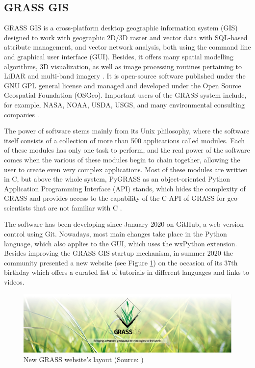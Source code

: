 \documentclass[a4paper,10pt,twoside]{article}
\begin{document}
\newpage
\vspace*{-1cm}
\subsection{GRASS GIS}
\label{subsection:grassgis}
\noindent GRASS GIS is a cross-platform desktop geographic information
system (GIS) designed to work with geographic 2D/3D raster and vector
data with SQL-based attribute management, and vector network analysis,
both using the command line and graphical user interface
(GUI). Besides, it offers many spatial modelling algorithms, 3D
visualization, as well as image processing routines pertaining to
LiDAR and multi-band imagery \cite{NETELER2012124}. It is open-source
software published under the GNU GPL general license and managed and
developed under the Open Source Geospatial Foundation
(OSGeo). Important users of the GRASS system include, for example,
NASA, NOAA, USDA, USGS, and many environmental consulting companies
\cite{grassgis}.

The power of software stems mainly from its Unix philosophy, where the
software itself consists of a collection of more than 500 applications
called modules. Each of these modules has only one task to perform,
and the real power of the software comes when the various of these
modules begin to chain together, allowing the user to create even very
complex applications. Most of these modules are written in C, but
above the whole system, PyGRASS as an object-oriented Python
Application Programming Interface (API) stands, which hides the
complexity of GRASS and provides access to the capability of the C-API
of GRASS for geo-scientists that are not familiar with C
\cite{pygrass}.

The software has been developing since January 2020 on GitHub, a web
version control using Git. Nowadays, most main changes take place in
the Python language, which also applies to the GUI, which uses the
wxPython extension. Besides improving the GRASS GIS startup mechanism,
in summer 2020 the community presented a new website (see Figure
\ref{fig:grass_gis}) on the occasion of its 37th birthday which offers
a curated list of tutorials in different languages and links to
videos.

\vspace{0.7cm}
\begin{figure}[hbt!]
\begin{center}
\includegraphics[width=16cm]{../pictures/grass_gis.png} 
\caption[New GRASS website's layout]{New GRASS website's layout (Source: \cite{grass})}
\label{fig:grass_gis}
\end{center}
\end{figure}
\end{document}
